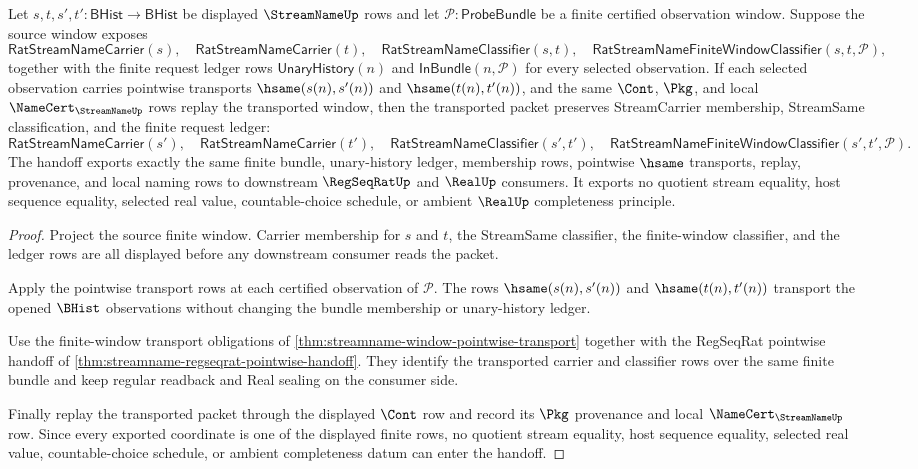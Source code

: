 \begin{theorem}
\label{thm:streamname-pointwise-window-transport}
Let $s,t,s',t':\mathsf{BHist}\to\mathsf{BHist}$ be displayed $\StreamNameUp$ rows and let $\mathcal{P}:\mathsf{ProbeBundle}$ be a finite certified observation window. Suppose the source window exposes
$$
\mathsf{RatStreamNameCarrier}(s),\quad
\mathsf{RatStreamNameCarrier}(t),\quad
\mathsf{RatStreamNameClassifier}(s,t),\quad
\mathsf{RatStreamNameFiniteWindowClassifier}(s,t,\mathcal{P}),
$$
together with the finite request ledger rows $\mathsf{UnaryHistory}(n)$ and $\mathsf{InBundle}(n,\mathcal{P})$ for every selected observation. If each selected observation carries pointwise transports $\hsame(s(n),s'(n))$ and $\hsame(t(n),t'(n))$, and the same $\Cont$, $\Pkg$, and local $\NameCert_{\StreamNameUp}$ rows replay the transported window, then the transported packet preserves StreamCarrier membership, StreamSame classification, and the finite request ledger:
$$
\mathsf{RatStreamNameCarrier}(s'),\quad
\mathsf{RatStreamNameCarrier}(t'),\quad
\mathsf{RatStreamNameClassifier}(s',t'),\quad
\mathsf{RatStreamNameFiniteWindowClassifier}(s',t',\mathcal{P}).
$$
The handoff exports exactly the same finite bundle, unary-history ledger, membership rows, pointwise $\hsame$ transports, replay, provenance, and local naming rows to downstream $\RegSeqRatUp$ and $\RealUp$ consumers. It exports no quotient stream equality, host sequence equality, selected real value, countable-choice schedule, or ambient $\RealUp$ completeness principle.
\end{theorem}
\begin{proof}
Project the source finite window. Carrier membership for $s$ and $t$, the StreamSame classifier, the finite-window classifier, and the ledger rows are all displayed before any downstream consumer reads the packet.

Apply the pointwise transport rows at each certified observation of $\mathcal{P}$. The rows $\hsame(s(n),s'(n))$ and $\hsame(t(n),t'(n))$ transport the opened $\BHist$ observations without changing the bundle membership or unary-history ledger.

Use the finite-window transport obligations of \autoref{thm:streamname-window-pointwise-transport} together with the RegSeqRat pointwise handoff of \autoref{thm:streamname-regseqrat-pointwise-handoff}. They identify the transported carrier and classifier rows over the same finite bundle and keep regular readback and Real sealing on the consumer side.

Finally replay the transported packet through the displayed $\Cont$ row and record its $\Pkg$ provenance and local $\NameCert_{\StreamNameUp}$ row. Since every exported coordinate is one of the displayed finite rows, no quotient stream equality, host sequence equality, selected real value, countable-choice schedule, or ambient completeness datum can enter the handoff.
\end{proof}
